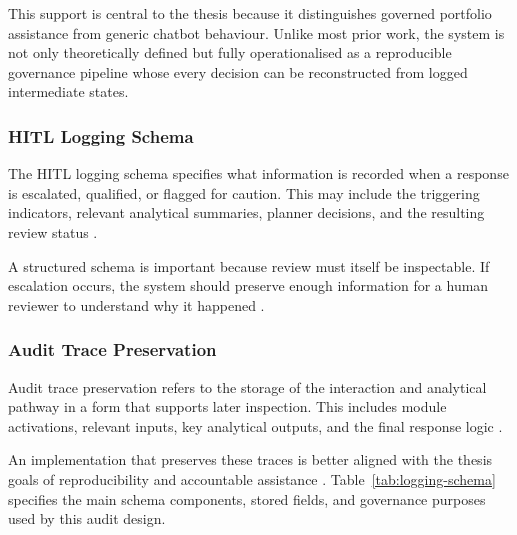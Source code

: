 \documentclass[11pt]{article}
\begin{document}
This support is central to the thesis because it distinguishes governed portfolio assistance from generic chatbot behaviour. Unlike most prior work, the system is not only theoretically defined but fully operationalised as a reproducible governance pipeline whose every decision can be reconstructed from logged intermediate states.

\subsubsection{HITL Logging Schema}
The HITL logging schema specifies what information is recorded when a response is escalated, qualified, or flagged for caution. This may include the triggering indicators, relevant analytical summaries, planner decisions, and the resulting review status \cite{amershi2014,aiact2024}.

A structured schema is important because review must itself be inspectable. If escalation occurs, the system should preserve enough information for a human reviewer to understand why it happened \cite{holzinger2016,mifid2014}.

\subsubsection{Audit Trace Preservation}
Audit trace preservation refers to the storage of the interaction and analytical pathway in a form that supports later inspection. This includes module activations, relevant inputs, key analytical outputs, and the final response logic \cite{adadi2018,arrieta2020}.

An implementation that preserves these traces is better aligned with the thesis goals of reproducibility and accountable assistance \cite{white2000,basel2011}. Table~\ref{tab:logging-schema} specifies the main schema components, stored fields, and governance purposes used by this audit design.
\end{document}
